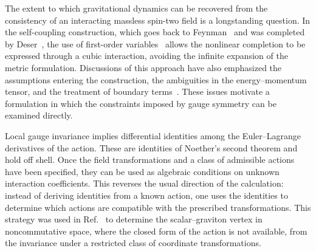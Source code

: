 \documentclass[prd,aps,preprint,nofootinbib,amsmath,amssymb,eqsecnum]{revtex4-2}
\begin{document}
The extent to which gravitational dynamics can be recovered from the consistency of an
interacting massless spin-two field is a longstanding question. In the self-coupling
construction, which goes back to Feynman~\cite{Feynman1995} and was completed by
Deser~\cite{Deser1970}, the use of first-order variables~\cite{Palatini1919,Ferraris1982} allows the nonlinear completion to
be expressed through a cubic interaction, avoiding the infinite expansion of the metric
formulation. Discussions of this approach have also emphasized the
assumptions entering the construction, the ambiguities in the energy--momentum tensor, and the
treatment of boundary terms~\cite{Padmanabhan2008,Deser2010}. These issues motivate a
formulation in which the constraints imposed by gauge symmetry can be examined directly.

Local gauge invariance implies differential identities among the Euler--Lagrange derivatives
of the action. These are identities of Noether's second theorem and hold off shell. Once the
field transformations and a class of admissible actions have been specified, they can be used
as algebraic conditions on unknown interaction coefficients. This reverses the usual direction
of the calculation: instead of deriving identities from a known action, one uses the
identities to determine which actions are compatible with the prescribed transformations.
This strategy was used in Ref.~\cite{BrandtElias2006} to determine the scalar--graviton
vertex in noncommutative space, where the closed form of the action is not available, from
the invariance under a restricted class of coordinate transformations.
\end{document}
